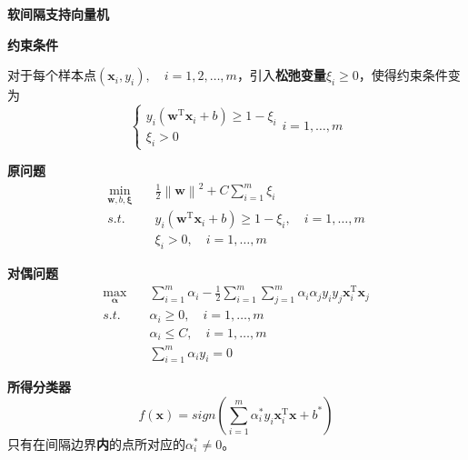 \documentclass[withoutpreface,bwprint]{NoteBook}
\begin{document}
\begin{minipage}[t]{0.48\textwidth} %
    \centering %
    \textbf{软间隔支持向量机}

    \textbf{约束条件}

    对于每个样本点$(\mathbf{x}_i,y_i),\quad i=1,2,\dots,m $，引入\textbf{松弛变量}$\xi_i \geq 0$，使得约束条件变为
    \begin{equation}
        \label{eq:软间隔支持向量机的约束条件}
        \begin{cases}
            y_i(\mathbf{w}^\mathrm{T} \mathbf{x}_i + b) \geq 1 - \xi_i\\
            \xi_i > 0 
        \end{cases}
        i=1,\dots,m    
    \end{equation}

    \textbf{原问题}
    \begin{align}
        \label{eq:软间隔支持向量机的优化问题}
        \min_{\mathbf{w},b,\bm{\xi}} \quad & \frac{1}{2}\left\| \mathbf{w} \right\|^2 + C \sum_{i=1}^{m} \xi_i \nonumber \\
        s.t. \quad  & y_i(\mathbf{w}^\mathrm{T} \mathbf{x}_i + b) \geq 1 - \xi_i,\quad i=1,\dots,m \nonumber\\
                    & \xi_i > 0 ,\quad i=1,\dots,m   
    \end{align}
    
    \textbf{对偶问题}
    \begin{align}
        \label{eq:软间隔支持向量机的对偶问题}
        \max_{\bm{\alpha}} \quad & \sum_{i=1}^{m} \alpha_i - \frac{1}{2} \sum_{i=1}^{m} \sum_{j=1}^{m} \alpha_i \alpha_j y_i y_j \mathbf{x}_i^\mathrm{T} \mathbf{x}_j \nonumber \\
        s.t. \quad & \alpha_i \geq 0, \quad i=1,\dots,m \nonumber \\
                & \alpha_i \leq C, \quad i=1,\dots,m \nonumber \\
                & \sum_{i=1}^{m} \alpha_i y_i = 0
    \end{align}

    \textbf{所得分类器}
    \begin{equation}
        \label{eq:软间隔支持向量机的分类器}
        f(\mathbf{x}) = sign \left( \sum_{i=1}^{m} \alpha_i^* y_i \mathbf{x}_i^\mathrm{T} \mathbf{x} + b^* \right)
    \end{equation}
    只有在间隔边界\textbf{内}的点所对应的$\alpha_i^* \neq 0$。
\end{minipage}
\vspace{0.02\textwidth} %
\end{document}

